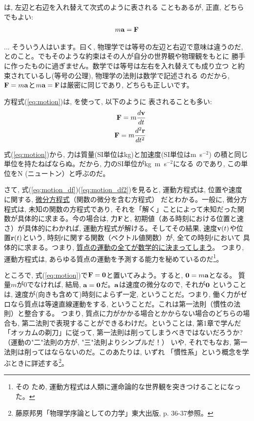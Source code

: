 は, 左辺と右辺を入れ替えて次式のように表される
こともあるが, 正直, どちらでもよい:
\begin{eqnarray}
m{\bf a}={\bf F}\label{eq:motion_ma_F}
\end{eqnarray}

\begin{faq}{\small{} ...
そういう人はいます。曰く, 物理学では等号の左辺と右辺で意味は違うのだ, 
とのこと。でもそのような約束はその人が自分の世界観や物理観をもとに
勝手に作ったものに過ぎません。数学では等号は左右を入れ替えても成り立つ
と約束されているし(等号の公理), 物理学の法則は数学で記述される
のだから, ${\bf F}=m{\bf a}$と$m{\bf a}={\bf F}$は厳密に同じであり, 
どちらも正しいです。}\end{faq}

方程式(\ref{eq:motion})は, を使って, 以下のように
表されることも多い: 
\begin{eqnarray}
&&{\bf F}=m\frac{d{\bf v}}{dt}\label{eq:motion_df}\\
&&{\bf F}=m\frac{d^2{\bf r}}{dt^2}\label{eq:motion_df2}
\end{eqnarray}

式(\ref{eq:motion})から, 力は質量(SI単位はkg)と加速度(SI単位はm~s$^{-2}$)
の積と同じ単位を持たねばならぬ。だから, 力のSI単位がkg~m~s$^{-2}$になる
のであり, この単位をN (ニュートン）と呼ぶのだ。

さて, 式(\ref{eq:motion_df})(\ref{eq:motion_df2})を見ると, 運動方程式は, 位置や速度
に関する, \underline{微分方程式}（関数の微分を含む方程式）
だとわかる。一般に, 微分方程式は, 未知の関数の方程式であり, 
それを「解く」ことによって未知だった関数が具体的に求まる。今の場合は, 
力${\bf F}$と, 初期値（ある時刻における位置と速さ）が具体的にわかれば, 
運動方程式が解ける。そしてその結果, 速度${\bf v}(t)$や位置${\bf r}(t)$という, 
時刻$t$に関する関数（ベクトル値関数）が, 全ての時刻$t$において
具体的に求まる。つまり, \underline{質点の運動の全てが数学的に決まってしまう}。
つまり, 運動方程式は, あらゆる質点の運動を予測する能力を秘めているのだ\footnote{その
ため, 運動方程式は人類に運命論的な世界観を突きつけることになった。}。

ところで, 式(\ref{eq:motion})で${\bf F}={\bf 0}$と置いてみよう。すると, ${\bf 0}=m{\bf a}$となる。
質量$m$が0でなければ, 結局, ${\bf a}={\bf 0}$だ。${\bf a}$は速度の微分なので, それが${\bf 0}$
ということは, 速度が(向きも含めて)時刻によらず一定, ということだ。つまり, 
働く力がゼロなら質点は等速直線運動をする, ということだ。これは第一法則（慣性の法則）と整合する。
つまり, 質点に力がかかる場合とかからない場合のどちらの場合も, 
第二法則で表現することができるわけだ。ということは, 第1章で学んだ「オッカムの剃刀」に従って, 
第一法則は削ってしまうべきではないだろうか?（運動の"二"法則の方が, 
"三"法則よりシンプルだ！） 
いや, それでもなお, 第一法則は削ってはならないのだ。このあたりは, いずれ
「慣性系」という概念を学ぶときに詳述する\footnote{
藤原邦男「物理学序論としての力学」東大出版, p. 36-37参照。}。

